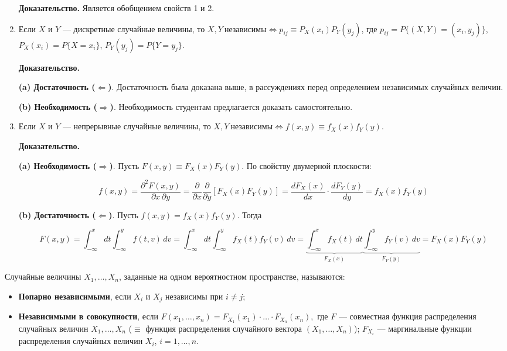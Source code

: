 \begin{enumerate}
	\textbf{Доказательство.} Является обобщением свойств 1 и 2.
	
	\item Если \( X \) и \( Y \) — дискретные случайные величины, то $X, Y \ \text{независимы} \Leftrightarrow p_{ij} \equiv P_X(x_i) P_Y(y_j)$,\newline
	где \( p_{ij} = P\{ (X, Y) = (x_i, y_j) \} \), \( P_X(x_i) = P\{ X = x_i \} \), \( P_Y(y_j) = P\{ Y = y_j \} \).
	
	\textbf{Доказательство.}
	
	\textbf{(a) Достаточность (\( \Leftarrow \))}.  
	Достаточность была доказана выше, в рассуждениях перед определением независимых случайных величин.
	
	\textbf{(b) Необходимость (\( \Rightarrow \))}.  
	Необходимость студентам предлагается доказать самостоятельно.
	
	\item Если \( X \) и \( Y \) — непрерывные случайные величины, то $X, Y \ \text{независимы} \Leftrightarrow f(x, y) \equiv f_X(x) f_Y(y)$.
	
	\textbf{Доказательство.}
	
	\textbf{(a) Необходимость (\( \Rightarrow \))}.  
	Пусть \( F(x, y) \equiv F_X(x) F_Y(y) \). По свойству двумерной плоскости:
	
	\[
	f(x, y) = \frac{\partial^2 F(x, y)}{\partial x \, \partial y} = \frac{\partial}{\partial x} \frac{\partial}{\partial y} [F_X(x) F_Y(y)] = \frac{d F_X(x)}{dx} \cdot \frac{d F_Y(y)}{dy} = f_X(x) f_Y(y)
	\]
	
	\textbf{(b) Достаточность (\( \Leftarrow \))}.  
	Пусть \( f(x, y) = f_X(x) f_Y(y) \). Тогда
	
	\[
	F(x, y) = \int_{-\infty}^{x} dt \int_{-\infty}^{y} f(t, v) \, dv =
	\int_{-\infty}^{x} dt \int_{-\infty}^{y} f_X(t) f_Y(v) \, dv = \underbrace{\int_{-\infty}^{x} f_X(t) \, dt}_{F_X(x)} \underbrace{\int_{-\infty}^{y} f_Y(v) \, dv}_{F_Y(y)} = F_X(x) F_Y(y)
	\]
\end{enumerate}


Случайные величины \( X_1, \dots, X_n \), заданные на одном вероятностном пространстве, называются:
\begin{itemize}
	\item \textbf{Попарно независимыми}, если \( X_i \) и \( X_j \) независимы при \( i \neq j \);
	\item \textbf{Независимыми в совокупности}, если $
	F(x_1, \dots, x_n) = F_{X_1}(x_1) \cdot \dots \cdot F_{X_n}(x_n),$
	где \( F \) — совместная функция распределения случайных величин \( X_1, \dots, X_n \) ($\equiv$ функция распределения случайного вектора \( (X_1, \dots, X_n) \)); \( F_{X_i} \) — маргинальные функции распределения случайных величин \( X_i \), \( i = 1, \dots, n \).
\end{itemize}

